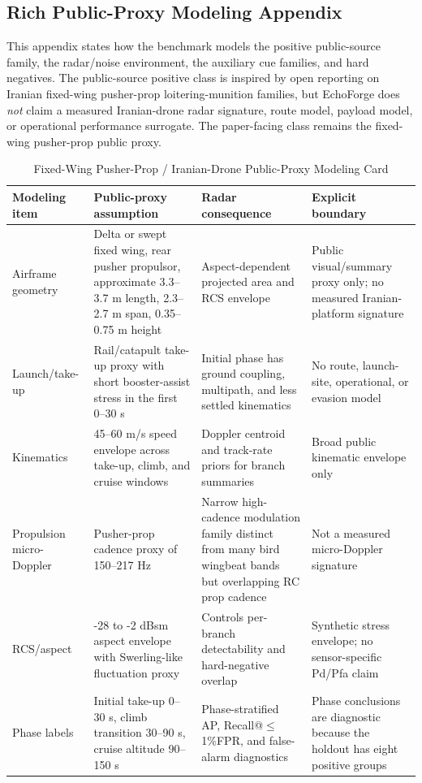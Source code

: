 \subsection{Rich Public-Proxy Modeling Appendix}
\label{sec:richmodelappendix}

This appendix states how the benchmark models the positive public-source family, the radar/noise environment, the auxiliary cue families, and hard negatives. The public-source positive class is inspired by open reporting on Iranian fixed-wing pusher-prop loitering-munition families, but EchoForge does \emph{not} claim a measured Iranian-drone radar signature, route model, payload model, or operational performance surrogate. The paper-facing class remains the fixed-wing pusher-prop public proxy.

\begin{table}[t]
  \caption{Fixed-Wing Pusher-Prop / Iranian-Drone Public-Proxy Modeling Card}
  \label{tab:publicproxymodel}
  \centering
  \small
  \begin{tabular}{@{}p{}p{}p{}p{}@{}}
    \toprule
    Modeling item & Public-proxy assumption & Radar consequence & Explicit boundary \\
    \midrule
    Airframe geometry & Delta or swept fixed wing, rear pusher propulsor, approximate 3.3--3.7 m length, 2.3--2.7 m span, 0.35--0.75 m height & Aspect-dependent projected area and RCS envelope & Public visual/summary proxy only; no measured Iranian-platform signature \\
    Launch/take-up & Rail/catapult take-up proxy with short booster-assist stress in the first 0--30 s & Initial phase has ground coupling, multipath, and less settled kinematics & No route, launch-site, operational, or evasion model \\
    Kinematics & 45--60 m/s speed envelope across take-up, climb, and cruise windows & Doppler centroid and track-rate priors for branch summaries & Broad public kinematic envelope only \\
    Propulsion micro-Doppler & Pusher-prop cadence proxy of 150--217 Hz & Narrow high-cadence modulation family distinct from many bird wingbeat bands but overlapping RC prop cadence & Not a measured micro-Doppler signature \\
    RCS/aspect & -28 to -2 dBsm aspect envelope with Swerling-like fluctuation proxy & Controls per-branch detectability and hard-negative overlap & Synthetic stress envelope; no sensor-specific Pd/Pfa claim \\
    Phase labels & Initial take-up 0--30 s, climb transition 30--90 s, cruise altitude 90--150 s & Phase-stratified AP, Recall@$\leq$1\%FPR, and false-alarm diagnostics & Phase conclusions are diagnostic because the holdout has eight positive groups \\
    \bottomrule
  \end{tabular}
\end{table}


